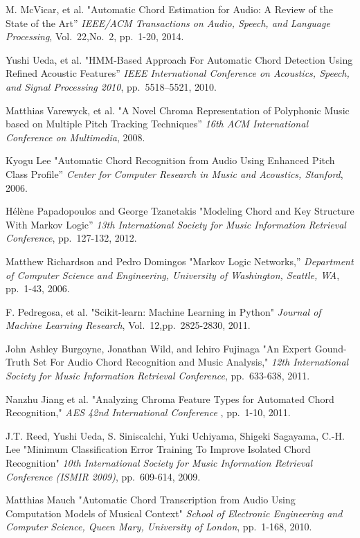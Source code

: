 \documentclass{article}
\begin{document}
{\begin{thebibliography}{citations}
M. McVicar, et al.
"Automatic Chord Estimation for Audio: A Review of the State of the Art''
{\it IEEE/ACM Transactions on Audio, Speech, and Language Processing},
Vol.~22,No.~2, pp.~1-20, 2014.

Yushi Ueda, et al.
"HMM-Based Approach For Automatic Chord Detection Using Refined Acoustic Features''
{\it IEEE International Conference on Acoustics, Speech, and Signal Processing 2010},
pp.~5518--5521, 2010.

Matthias Varewyck, et al.
"A Novel Chroma Representation of Polyphonic Music based on Multiple Pitch Tracking Techniques''
{\it 16th ACM International Conference on Multimedia},
2008.

Kyogu Lee
"Automatic Chord Recognition from Audio Using Enhanced Pitch Class Profile''
{\it Center for Computer Research in Music and Acoustics, Stanford},
2006.

Hélène Papadopoulos and George Tzanetakis
"Modeling Chord and Key Structure With Markov Logic''
{\it 13th International Society for Music Information Retrieval Conference},
pp.~127-132, 2012.

Matthew Richardson and Pedro Domingos
"Markov Logic Networks,''
{\it Department of Computer Science and Engineering, University of Washington, Seattle, WA},
pp.~1-43, 2006.

F. Pedregosa, et al.
"Scikit-learn: Machine Learning in Python"
{\it Journal of Machine Learning Research},
Vol.~12,pp.~2825-2830, 2011.

John Ashley Burgoyne, Jonathan Wild, and Ichiro Fujinaga
"An Expert Gound-Truth Set For Audio Chord Recognition and Music Analysis,"
{\it 12th International Society for Music Information Retrieval Conference},
pp.~633-638, 2011.

Nanzhu Jiang et al.
"Analyzing Chroma Feature Types for Automated Chord Recognition,"
{\it AES 42nd International Conference },
pp.~1-10, 2011.

J.T. Reed, Yushi Ueda, S. Siniscalchi, Yuki Uchiyama, Shigeki Sagayama, C.-H. Lee
"Minimum Classification Error Training To Improve Isolated Chord Recognition"
{\it 10th International Society for Music Information Retrieval Conference (ISMIR 2009)},
pp.~609-614, 2009.

Matthias Mauch
"Automatic Chord Transcription from Audio Using Computation Models of Musical Context"
{\it School of Electronic Engineering and Computer Science, Queen Mary, University of London},
pp.~1-168, 2010.


\end{thebibliography}}
\end{document}
